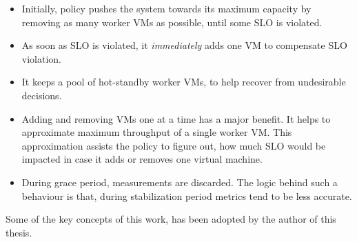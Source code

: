 \begin{itemize}
\item Initially, policy pushes the system towards its maximum capacity by removing as many worker VMs as possible, until some SLO is violated.
\item As soon as SLO is violated, it \emph{immediately} adds one VM to compensate SLO violation.
\item It keeps a pool of hot-standby worker VMs, to help recover from undesirable decisions.
\item Adding and removing VMs one at a time has a major benefit. It helps to approximate maximum throughput of a single worker VM. This approximation assists the policy to figure out, how much SLO would be impacted in case it adds or removes one virtual machine.
\item During grace period, measurements are discarded. The logic behind such a behaviour is that, during stabilization period metrics tend to be less accurate.
\end{itemize}
Some of the key concepts of this work, has been adopted by the author of this thesis.\newline